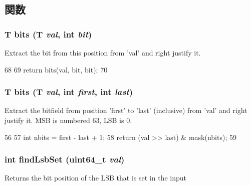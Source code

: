 \subsection{関数}
\hypertarget{bitfield_8hh_aabcb6224f8edd34a75739bf5df0e75fb}{
\subsubsection[{bits}]{\setlength{\rightskip}{0pt plus 5cm}T bits (T {\em val}, \/  int {\em bit})}}
\label{bitfield_8hh_aabcb6224f8edd34a75739bf5df0e75fb}
Extract the bit from this position from 'val' and right justify it. 


\begin{DoxyCode}
68 {
69     return bits(val, bit, bit);
70 }
\end{DoxyCode}
\hypertarget{bitfield_8hh_a4ee0dc0723e11679c52429d5f8e05123}{
\subsubsection[{bits}]{\setlength{\rightskip}{0pt plus 5cm}T bits (T {\em val}, \/  int {\em first}, \/  int {\em last})}}
\label{bitfield_8hh_a4ee0dc0723e11679c52429d5f8e05123}
Extract the bitfield from position 'first' to 'last' (inclusive) from 'val' and right justify it. MSB is numbered 63, LSB is 0. 


\begin{DoxyCode}
56 {
57     int nbits = first - last + 1;
58     return (val >> last) & mask(nbits);
59 }
\end{DoxyCode}
\hypertarget{bitfield_8hh_a224a4f55757322870a3fa87b5d5254ee}{
\subsubsection[{findLsbSet}]{\setlength{\rightskip}{0pt plus 5cm}int findLsbSet (uint64\_\-t {\em val})}}
\label{bitfield_8hh_a224a4f55757322870a3fa87b5d5254ee}
Returns the bit position of the LSB that is set in the input 


